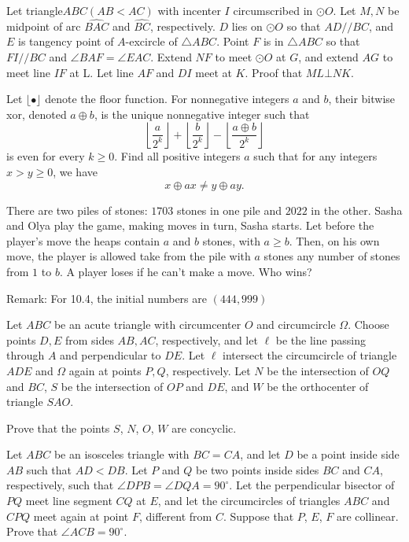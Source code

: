 \documentclass[11pt]{scrartcl}
\begin{document}
\begin{problem}[239934686230450]
Let triangle$ABC(AB<AC)$ with incenter $I$ circumscribed in $\odot O$. Let $M,N$ be midpoint of arc $\widehat{BAC}$ and $\widehat{BC}$, respectively. $D$ lies on $\odot O$ so that $AD//BC$, and $E$ is tangency point of $A$-excircle of $\bigtriangleup ABC$. Point $F$ is in $\bigtriangleup ABC$ so that $FI//BC$ and $\angle BAF=\angle EAC$. Extend $NF$ to meet $\odot O$ at $G$, and extend $AG$ to meet line $IF$ at L. Let line $AF$ and $DI$ meet at $K$. Proof that $ML\bot NK$.
\end{problem}
\begin{problem}[3780160396229984886]
	Let $\lfloor \bullet \rfloor$ denote the floor function. For nonnegative integers $a$ and $b$, their bitwise xor, denoted $a \oplus b$, is the unique nonnegative integer such that$$ \left \lfloor \frac{a}{2^k}  \right \rfloor+ \left\lfloor\frac{b}{2^k} \right\rfloor - \left\lfloor \frac{a\oplus b}{2^k}\right\rfloor$$is even for every $k \ge 0$. Find all positive integers $a$ such that for any integers $x>y\ge 0$, we have\[ x\oplus ax \neq y \oplus ay. \]
\end{problem}
\begin{problem}[15195306726194]
There are two piles of stones: $1703$ stones in one pile and $2022$ in the other. Sasha and Olya
play the game, making moves in turn, Sasha starts. Let before the player's move the heaps contain $a$ and $b$ stones, with $a \geq b$. Then, on his own move, the player is allowed take from the pile with $a$ stones any number of stones from $1$ to $b$. A player loses if he can't make a move. Who wins?

Remark: For 10.4, the initial numbers are $(444,999)$
\end{problem}
\begin{problem}[5066939379306191291]
Let $ABC$ be an acute triangle with circumcenter $O$ and circumcircle $\Omega$. Choose points $D, E$ from sides $AB, AC$, respectively, and let $\ell$ be the line passing through $A$ and perpendicular to $DE$. Let $\ell$ intersect the circumcircle of triangle $ADE$ and $\Omega$ again at points $P, Q$, respectively. Let $N$ be the intersection of $OQ$ and $BC$, $S$ be the intersection of $OP$ and $DE$, and $W$ be the orthocenter of triangle $SAO$.

Prove that the points $S$, $N$, $O$, $W$ are concyclic.
\end{problem}
\begin{problem}[6302540840099076878]
Let $ABC$ be an isosceles triangle with $BC=CA$, and let $D$ be a point inside side $AB$ such that $AD< DB$. Let $P$ and $Q$ be two points inside sides $BC$ and $CA$, respectively, such that $\angle DPB = \angle DQA = 90^{\circ}$. Let the perpendicular bisector of $PQ$ meet line segment $CQ$ at $E$, and let the circumcircles of triangles $ABC$ and $CPQ$ meet again at point $F$, different from $C$.
Suppose that $P$, $E$, $F$ are collinear. Prove that $\angle ACB = 90^{\circ}$.
\end{problem}
\end{document}
